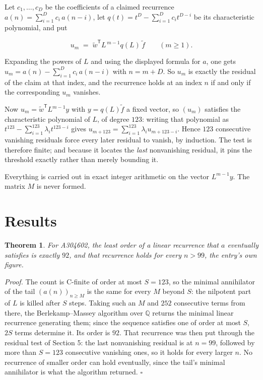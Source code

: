 \documentclass[11pt]{article}
\newtheorem{theorem}{Theorem}
\theoremstyle{definition}
\begin{document}
Let $c_1,\dots,c_D$ be the coefficients of a claimed recurrence $a(n) = \sum_{i=1}^{D} c_i\,a(n-i)$, let $q(t) = t^{D} - \sum_{i=1}^{D} c_i t^{D-i}$ be its characteristic polynomial, and put

\[u_m \;=\; \tilde w^{\mathsf T} L^{\,m-1} q(L)\,\tilde f \qquad (m \ge 1).\]

Expanding the powers of $L$ and using the displayed formula for $a$, one gets $u_m = a(n) - \sum_{i=1}^{D} c_i\,a(n-i)$ with $n = m + D$. So $u_m$ is exactly the residual of the claim at that index, and the recurrence holds at an index $n$ if and only if the corresponding $u_m$ vanishes.

Now $u_m = \tilde w^{\mathsf T} L^{m-1} y$ with $y = q(L)\tilde f$ a fixed vector, so $(u_m)$ satisfies the characteristic polynomial of $L$, of degree $123$: writing that polynomial as $t^{123} - \sum_{i=1}^{123} \lambda_i t^{123-i}$ gives $u_{m+123} = \sum_{i=1}^{123} \lambda_i u_{m+123-i}$. Hence $123$ consecutive vanishing residuals force every later residual to vanish, by induction. The test is therefore finite; and because it locates the {\itshape last} nonvanishing residual, it pins the threshold exactly rather than merely bounding it.

Everything is carried out in exact integer arithmetic on the vector $L^{m-1}y$. The matrix $M$ is never formed.

\section{Results}

\begin{theorem} For A304602, the least order of a linear recurrence that $a$ eventually satisfies is exactly $92$, and that recurrence holds for every $n > 99$, the entry's own figure.\end{theorem}

{\itshape Proof.} The count is C-finite of order at most $S = 123$, so the minimal annihilator of the tail $(a(n))_{n \ge M}$ is the same for every $M$ beyond $S$: the nilpotent part of $L$ is killed after $S$ steps. Taking such an $M$ and $252$ consecutive terms from there, the Berlekamp--Massey algorithm over $\mathbb{Q}$ returns the minimal linear recurrence generating them; since the sequence satisfies one of order at most $S$, $2S$ terms determine it. Its order is $92$. That recurrence was then put through the residual test of Section 5: the last nonvanishing residual is at $n = 99$, followed by more than $S = 123$ consecutive vanishing ones, so it holds for every larger $n$. No recurrence of smaller order can hold eventually, since the tail's minimal annihilator is what the algorithm returned. $\square$
\end{document}
